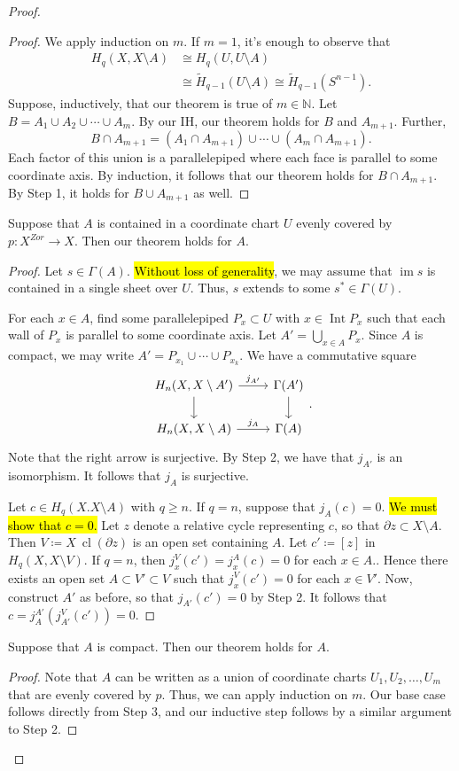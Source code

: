 \documentclass[10pt,letterpaper,cm]{nupset}
\theoremstyle{definition}
\theoremstyle{theorem}
\theoremstyle{remark}
\newcommand{\N}{\mathbb N}
\newcommand{\1}{\mathbb{1}}
\newcommand{\0}{\vec 0}
\DeclareMathOperator{\im}{im}
\DeclareMathOperator{\Int}{Int}
\DeclareMathOperator{\cl}{cl}
\begin{document}
\begin{proof}
\begin{steps}
\begin{proof}
We apply induction on $m$. If $m=1$, it's enough to observe that
\begin{align*}
H_q(X, X\setminus A) & \cong H_q(U, U\setminus A)
\\ &\cong  \widetilde{H}_{q-1}(U\setminus A) \cong \widetilde{H}_{q-1}(S^{n-1}).
\end{align*} Suppose, inductively, that our theorem is true of $m\in \N$. Let $B= A_1 \cup A_2 \cup \cdots \cup  A_m$. By our IH, our theorem holds for $B$ and $A_{m+1}$. Further, $$B \cap A_{m+1} = (A_1 \cap A_{m+1}) \cup \cdots \cup (A_m \cap A_{m+1}) .$$ Each factor of this union is a parallelepiped where each face is parallel to some coordinate axis. By induction, it follows that our theorem holds for $B \cap A_{m+1}$. By Step 1, it holds for $B \cup A_{m+1}$ as well.
\end{proof}
\item Suppose that $A$ is contained in a coordinate chart $U$ evenly covered by $p: X^{Zor} \to X$. Then our theorem holds for $A$.
\begin{proof}
Let $s\in \Gamma(A)$. \hl{Without loss of generality}, we may assume that $\im{s}$ is contained in a single sheet over $U$. Thus, $s$ extends to some $s^{\ast} \in \Gamma(U)$.

For each $x\in A$, find some parallelepiped $P_x \subset U$ with $x\in \Int{P_x}$ such that each wall of $P_x$ is parallel to some coordinate axis. Let $A' = \bigcup_{x\in A}P_x$. Since $A$ is compact, we may write $A' = P_{x_1} \cup \cdots \cup P_{x_k}$. We have a commutative square
\[
\begin{tikzcd}
{H_n(X, X\setminus A')} \arrow[r, "j_{A'}"] \arrow[d] & \Gamma(A') \arrow[d] \\
{H_n(X, X\setminus A)} \arrow[r, "j_A"]               & \Gamma(A)           
\end{tikzcd}
.\] Note that the right arrow is surjective. By Step 2, we have that $j_{A'}$ is an isomorphism. It follows that $j_A$ is surjective.

Let $c\in H_q(X. X\setminus A)$ with $q\geq n$. If $q=n$, suppose that $j_A(c) =0$. \hl{We must show that $c=0$.} Let $z$ denote a relative cycle representing $c$, so that $\partial{z} \subset X\setminus A$. Then $V\coloneqq  X\ \cl(\partial{z})$ is an open set containing $A$. Let $c' \coloneqq  [z]$ in $H_q(X, X \setminus V)$.  If $q=n$, then $j_x^V(c') = j_x^A(c) =0$ for each $x\in A$.. Hence there exists an open set $A\subset V'\subset V$ such that $j_x^V(c') =0$ for each $x\in V'$.  Now, construct $A'$ as before, so that $j_{A'}(c') =0$ by Step 2. It follows that $c = j_A^{A'}(j_{A'}^V(c'))=0$.
\end{proof}
\item Suppose that $A$ is compact. Then our theorem holds for $A$. 
\begin{proof} Note that $A$ can be written as a union of coordinate charts $U_1, U_2, \ldots, U_m$ that are evenly covered by $p$. Thus, we can apply induction on $m$. Our base case follows directly from Step 3, and our inductive step follows by a similar argument to Step 2.
\end{proof}
\end{steps}
\end{proof}
\end{document}
